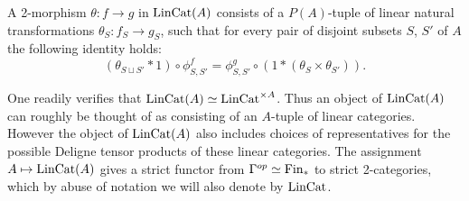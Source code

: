 \documentclass{amsart}
\begin{document}
A 2-morphism $\theta: f \to g$ in $\mathrm{LinCat}(A)$ consists of a $P(A)$-tuple of linear natural transformations $\theta_S: f_S \to g_S$, such that for every pair of disjoint subsets $S$, $S'$ of $A$ the following identity holds: 
\begin{equation*}
	(\theta_{S\sqcup S'}* 1) \circ \phi^f_{S,S'} = \phi^g_{S,S'} \circ (1 * (\theta_S \times \theta_{S'})).
\end{equation*}

One readily verifies that $\mathrm{LinCat}(A) \simeq \mathrm{LinCat}^{\times A}$. Thus an object of $\mathrm{LinCat}(A)$ can roughly be thought of as consisting of an $A$-tuple of linear categories. However the object of $\mathrm{LinCat}(A)$ also includes choices of representatives for the possible Deligne tensor products of these linear categories. The assignment $A \mapsto \mathrm{LinCat}(A)$ gives a strict functor from $\Gamma^{op} \simeq \mathrm{Fin}_*$ to strict 2-categories, which by abuse of notation we will also denote by $\mathrm{LinCat}$. 









\end{document}

